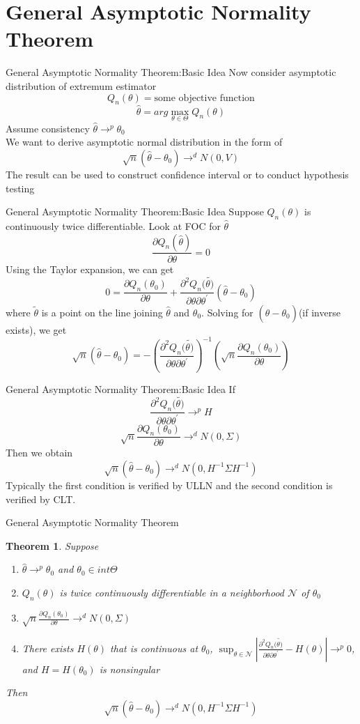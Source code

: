 \documentclass{beamer}
\newtheorem{thm}{Theorem}[subsection]
\begin{document}
\section{General Asymptotic Normality Theorem}
\begin{frame}{General Asymptotic Normality Theorem:Basic Idea}
	Now consider asymptotic distribution of extremum estimator
	\[Q_n(\theta) = \text{some objective function}\]
	\[\hat{\theta} = arg \max_{\theta \in \Theta} Q_n(\theta)\]
	Assume consistency $\hat{\theta} \rightarrow^p \theta_0$ \\
	We want to derive asymptotic normal distribution in the form of 
	\[\sqrt{n} (\hat{\theta} - \theta_0) \rightarrow^d N(0,V)\] 
	The result can be used to construct confidence interval or to conduct hypothesis testing
\end{frame}
\begin{frame}{General Asymptotic Normality Theorem:Basic Idea}
Suppose $Q_n(\theta)$ is continuously twice differentiable. Look at FOC for $\hat{\theta}$
\[\frac{\partial Q_n(\hat{\theta})}{\partial \theta} = 0\]
	Using the Taylor expansion, we can get 
	\[0 = \frac{\partial Q_n(\theta_0)}{\partial \theta} + \frac{\partial^2 Q_n(\tilde{\theta)}}{\partial \theta \partial \theta^{'}}(\hat{\theta} - \theta_0)\]
	where $\tilde{\theta}$ is a point on the line joining $\hat{\theta}$ and $\theta_0$. Solving for $(\hat{\theta} - \theta_0)$(if inverse exists), we get
	\[\sqrt{n} (\hat{\theta} - \theta_0) = - (\frac{\partial^2 Q_n(\tilde{\theta)}}{\partial\theta \partial \theta^{'}})^{-1} (\sqrt{n} \frac{\partial Q_n(\theta_0)}{\partial \theta})\]
\end{frame}
\begin{frame}{General Asymptotic Normality Theorem:Basic Idea}
	If 
	\[\frac{\partial^2 Q_n(\tilde{\theta)}}{\partial\theta \partial \theta^{'}} \rightarrow^p H\]
	\[\sqrt{n} \frac{\partial Q_n(\theta_0)}{\partial \theta} \rightarrow^d N(0,\Sigma)\]
	Then we obtain
	\[\sqrt{n} (\hat{\theta} - \theta_0) \rightarrow^d N(0,H^{-1}\Sigma H^{-1})\]
	Typically the first condition is verified by ULLN and the second condition is verified by CLT.
\end{frame}
\begin{frame}{General Asymptotic Normality Theorem}
	\begin{thm}
		Suppose
		\begin{enumerate}
			\item $\hat{\theta} \rightarrow^p \theta_0$ and $\theta_0 \in int\Theta$
			\item $Q_n(\theta)$ is twice continuously differentiable in a neighborhood $\mathcal{N}$ of $\theta_0$
			\item $\sqrt{n} \frac{\partial Q_n(\theta_0)}{\partial \theta} \rightarrow^d N(0,\Sigma)$
			\item There exists $H(\theta)$ that is continuous at $\theta_0$, $\sup_{\theta \in \mathcal{N}} |\frac{\partial^2 Q_n(\tilde{\theta)}}{\partial\theta \partial \theta^{'}} - H(\theta)| \rightarrow^p 0$, and $H = H(\theta_0)$ is nonsingular
		\end{enumerate}
		Then
		\[\sqrt{n}(\hat{\theta} - \theta_0) \rightarrow^d N(0,H^{-1} \Sigma H^{-1})\]
	\end{thm}
\end{frame}
\end{document}
